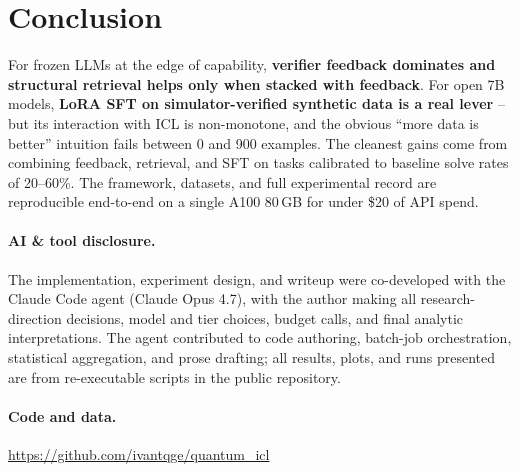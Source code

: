 \documentclass[11pt]{article}
\begin{document}
\section{Conclusion}

For frozen LLMs at the edge of capability, \textbf{verifier feedback dominates and structural retrieval helps only when stacked with feedback}. For open 7B models, \textbf{LoRA SFT on simulator-verified synthetic data is a real lever} -- but its interaction with ICL is non-monotone, and the obvious ``more data is better'' intuition fails between 0 and 900 examples. The cleanest gains come from combining feedback, retrieval, and SFT on tasks calibrated to baseline solve rates of 20--60\%. The framework, datasets, and full experimental record are reproducible end-to-end on a single A100 80\,GB for under \$20 of API spend.

\paragraph{AI \& tool disclosure.} The implementation, experiment design, and writeup were co-developed with the Claude Code agent (Claude Opus 4.7), with the author making all research-direction decisions, model and tier choices, budget calls, and final analytic interpretations. The agent contributed to code authoring, batch-job orchestration, statistical aggregation, and prose drafting; all results, plots, and runs presented are from re-executable scripts in the public repository.

\paragraph{Code and data.} \url{https://github.com/ivantqge/quantum_icl}
\end{document}
